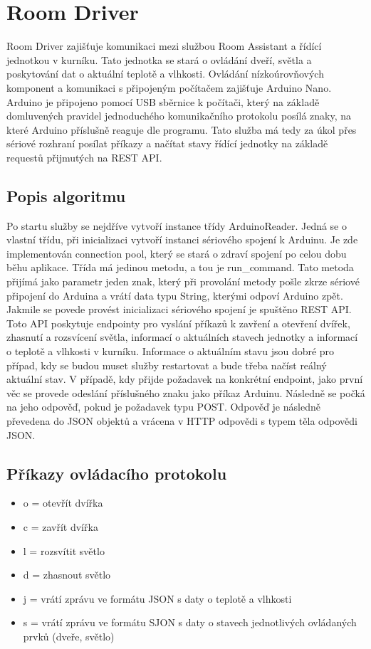 \section{Room Driver}\label{sec:room-driver}
Room Driver zajišťuje komunikaci mezi službou Room Assistant a řídící jednotkou v kurníku.
Tato jednotka se stará o ovládání dveří, světla a poskytování dat o aktuální teplotě a vlhkosti.
Ovládání nízkoúrovňových komponent a komunikaci s připojeným počítačem zajišťuje Arduino Nano.
Arduino je připojeno pomocí USB sběrnice k počítači, který na základě domluvených pravidel jednoduchého komunikačního protokolu posílá znaky, na které Arduino příslušně reaguje dle programu.
Tato služba má tedy za úkol přes sériové rozhraní posílat příkazy a načítat stavy řídící jednotky na základě requestů přijmutých na REST API.

\subsection*{Popis algoritmu}
Po startu služby se nejdříve vytvoří instance třídy ArduinoReader.
Jedná se o vlastní třídu, při inicializaci vytvoří instanci sériového spojení k Arduinu.
Je zde implementován connection pool, který se stará o zdraví spojení po celou dobu běhu aplikace.
Třída má jedinou metodu, a tou je run\_command.
Tato metoda přijímá jako parametr jeden znak, který při provolání metody pošle zkrze sériové připojení do Arduina a vrátí data typu String, kterými odpoví Arduino zpět.
Jakmile se povede provést inicializaci sériového spojení je spuštěno REST API.
Toto API poskytuje endpointy pro vyslání příkazů k zavření a otevření dvířek, zhasnutí a rozsvícení světla, informací o aktuálních stavech jednotky a informací o teplotě a vlhkosti v kurníku.
Informace o aktuálním stavu jsou dobré pro případ, kdy se budou muset služby restartovat a bude třeba načíst reálný aktuální stav.
V případě, kdy přijde požadavek na konkrétní endpoint, jako první věc se provede odeslání příslušného znaku jako příkaz Arduinu.
Následně se počká na jeho odpověď, pokud je požadavek typu POST.
Odpověď je následně převedena do JSON objektů a vrácena v HTTP odpovědi s typem těla odpovědi JSON.

\subsection*{Příkazy ovládacího protokolu}
\begin{itemize}
    \item o = otevřít dvířka
    \item c = zavřít dvířka
    \item l = rozsvítit světlo
    \item d = zhasnout světlo
    \item j = vrátí zprávu ve formátu JSON s daty o teplotě a vlhkosti
    \item s = vrátí zprávu ve formátu SJON s daty o stavech jednotlivých ovládaných prvků (dveře, světlo)
\end{itemize}


